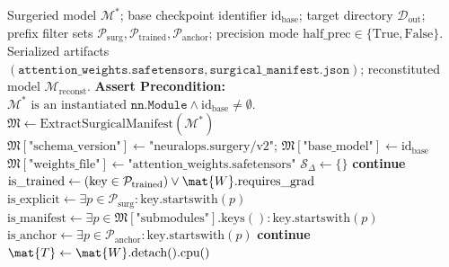 \begin{algorithm}[H]
\caption[Modular Surgical Delta Serialization and Deserialization]{Modular Surgical Delta Serialization and Deserialization}
\label{alg:modular_surgical_delta}
\begin{algorithmic}[1]
\REQUIRE Surgeried model $\mathcal{M}^*$; base checkpoint identifier $\text{id}_{\text{base}}$; target directory $\mathcal{D}_{\text{out}}$; prefix filter sets $\mathcal{P}_{\text{surg}}, \mathcal{P}_{\text{trained}}, \mathcal{P}_{\text{anchor}}$; precision mode $\text{half\_prec} \in \{\text{True}, \text{False}\}$.
\ENSURE Serialized artifacts $(\texttt{attention\_weights.safetensors}, \texttt{surgical\_manifest.json})$; reconstituted model $\mathcal{M}_{\text{reconst}}$.
\STATE \textbf{Assert Precondition:} $\mathcal{M}^* \text{ is an instantiated } \texttt{nn.Module} \land \text{id}_{\text{base}} \ne \emptyset$.
\STATE {}
\STATE $\mathfrak{M} \leftarrow \text{ExtractSurgicalManifest}(\mathcal{M}^*)$ 
\STATE $\mathfrak{M}[\text{"schema\_version"}] \leftarrow \text{"neuralops.surgery/v2"}$; $\mathfrak{M}[\text{"base\_model"}] \leftarrow \text{id}_{\text{base}}$
\STATE $\mathfrak{M}[\text{"weights\_file"}] \leftarrow \text{"attention\_weights.safetensors"}$
\STATE $\mathcal{S}_{\Delta} \leftarrow \{\}$ 
        \STATE \textbf{continue} 
    \ENDIF
    \STATE $\text{is\_trained} \leftarrow (\text{key} \in \mathcal{P}_{\text{trained}}) \lor \mat{W}.\text{requires\_grad}$
    \STATE $\text{is\_explicit} \leftarrow \exists p \in \mathcal{P}_{\text{surg}} : \text{key.startswith}(p)$
    \STATE $\text{is\_manifest} \leftarrow \exists p \in \mathfrak{M}[\text{"submodules"}].\text{keys}() : \text{key.startswith}(p)$
    \STATE $\text{is\_anchor} \leftarrow \exists p \in \mathcal{P}_{\text{anchor}} : \text{key.startswith}(p)$
        \STATE \textbf{continue} 
    \ENDIF
        \STATE $\mat{T} \leftarrow \mat{W}.\text{detach}().\text{cpu}()$

\end{algorithmic}
\end{algorithm}
